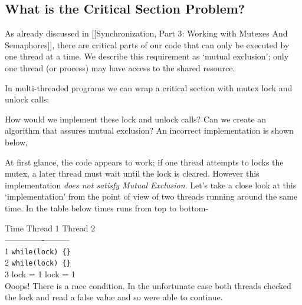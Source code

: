 \subsection{What is the Critical Section
Problem?}\label{what-is-the-critical-section-problem}

As already discussed in {[}{[}Synchronization, Part 3: Working with
Mutexes And Semaphores{]}{]}, there are critical parts of our code that
can only be executed by one thread at a time. We describe this
requirement as `mutual exclusion'; only one thread (or process) may have
access to the shared resource.

In multi-threaded programs we can wrap a critical section with mutex
lock and unlock calls:

\begin{Shaded}
\begin{Highlighting}[]
\end{Highlighting}
\end{Shaded}

How would we implement these lock and unlock calls? Can we create an
algorithm that assures mutual exclusion? An incorrect implementation is
shown below,

\begin{Shaded}
\begin{Highlighting}[]
\NormalTok{;\}}
\NormalTok{; \}}
\end{Highlighting}
\end{Shaded}

At first glance, the code appears to work; if one thread attempts to
locks the mutex, a later thread must wait until the lock is cleared.
However this implementation \emph{does not satisfy Mutual Exclusion}.
Let's take a close look at this `implementation' from the point of view
of two threads running around the same time. In the table below times
runs from top to bottom-

Time \textbar{} Thread 1 \textbar{} Thread
2\\-----\textbar{}----------\textbar{}---------\\1 \textbar{}
\texttt{while(lock)\ \{\}}\\2 \textbar{} \textbar{}
\texttt{while(lock)\ \{\}} \textbar{}\\3 \textbar{} lock = 1 \textbar{}
lock = 1 \textbar{}\\Ooops! There is a race condition. In the
unfortunate case both threads checked the lock and read a false value
and so were able to continue.

